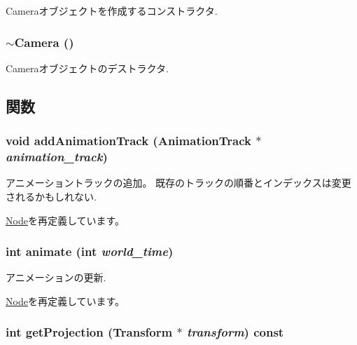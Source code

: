 Cameraオブジェクトを作成するコンストラクタ. \hypertarget{classm3g_1_1Camera_b921e886e6f14e117eb8099ccb0a3775}{
\subsubsection[{$\sim$Camera}]{\setlength{\rightskip}{0pt plus 5cm}$\sim${\bf Camera} ()}}
\label{classm3g_1_1Camera_b921e886e6f14e117eb8099ccb0a3775}


Cameraオブジェクトのデストラクタ. 

\subsection{関数}
\hypertarget{classm3g_1_1Camera_415c0b110f95410ded9b85e5d99a496b}{
\subsubsection[{addAnimationTrack}]{\setlength{\rightskip}{0pt plus 5cm}void addAnimationTrack ({\bf AnimationTrack} $\ast$ {\em animation\_\-track})}}
\label{classm3g_1_1Camera_415c0b110f95410ded9b85e5d99a496b}


アニメーショントラックの追加。 既存のトラックの順番とインデックスは変更されるかもしれない. 

\hyperlink{classm3g_1_1Node_415c0b110f95410ded9b85e5d99a496b}{Node}を再定義しています。\hypertarget{classm3g_1_1Camera_8aad1ceab4c2a03609c8a42324ce484d}{
\subsubsection[{animate}]{\setlength{\rightskip}{0pt plus 5cm}int animate (int {\em world\_\-time})}}
\label{classm3g_1_1Camera_8aad1ceab4c2a03609c8a42324ce484d}


アニメーションの更新. 

\hyperlink{classm3g_1_1Node_8aad1ceab4c2a03609c8a42324ce484d}{Node}を再定義しています。\hypertarget{classm3g_1_1Camera_9e0c204df146342990703acb744954b1}{
\subsubsection[{getProjection}]{\setlength{\rightskip}{0pt plus 5cm}int getProjection ({\bf Transform} $\ast$ {\em transform}) const}}
\label{classm3g_1_1Camera_9e0c204df146342990703acb744954b1}


